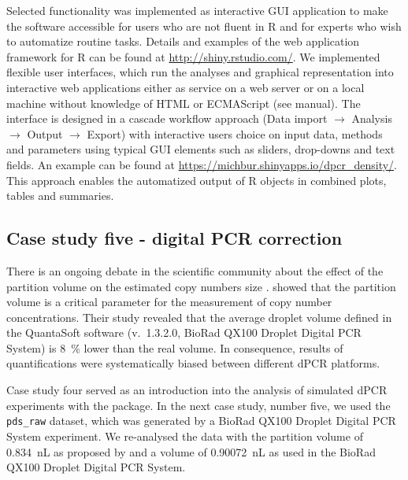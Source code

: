 Selected functionality was implemented as interactive  GUI 
application to make the software accessible for users who are not fluent in R 
and for experts who wish to automatize routine tasks. Details and examples of 
the  web application framework for R can be found at 
\url{http://shiny.rstudio.com/}. We implemented flexible user interfaces, which 
run the analyses and graphical representation into interactive web applications 
either as service on a web server or on a local machine without knowledge of 
HTML or ECMAScript (see  manual). The interface is designed in a 
cascade workflow approach (Data import $\rightarrow$ Analysis $\rightarrow$ 
Output $\rightarrow$ Export) with interactive users choice on input data, 
methods and parameters using typical GUI elements such as sliders, drop-downs 
and text fields. An example can be found at 
\url{https://michbur.shinyapps.io/dpcr_density/}. This approach enables the 
automatized output of R objects in combined plots, tables and summaries.

\subsection{Case study five - digital PCR correction}

There is an ongoing debate in the scientific community about the effect of the 
partition volume on the estimated copy numbers size 
\citep{huggett_clinchem_2014, corbisier_2015, majumdar_2015}. 
\citet{corbisier_2015} showed that the partition volume is a critical parameter 
for the measurement of copy number concentrations. Their study revealed that the 
average droplet volume defined in the QuantaSoft software (v.~1.3.2.0, BioRad 
QX100 Droplet Digital PCR System) is 8~\% lower than the real volume. In 
consequence, results of quantifications were systematically biased between 
different dPCR platforms. 

Case study four served as an introduction into the analysis of simulated dPCR 
experiments with the  package. In the next case study, number 
five, we used the \texttt{pds\_raw} dataset, which was generated by a BioRad 
QX100 Droplet Digital PCR System experiment. We re-analysed the data with the 
partition volume of 0.834~nL as proposed by \citet{corbisier_2015} and a volume 
of 0.90072~nL as used in the BioRad QX100 Droplet Digital PCR System.

